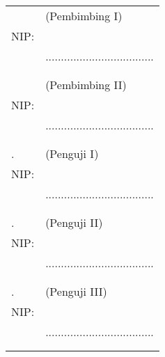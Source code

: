 \noindent
\begin{tabularx}{\textwidth}{X l}
  \advisor{}               & (Pembimbing I)                      \\
  NIP: \advisornip{}       &                                     \\
                           & ................................... \\
                           &                                     \\
                           &                                     \\
  \coadvisor{}             & (Pembimbing II)                     \\
  NIP: \coadvisornip{}     &                                     \\
                           & ................................... \\
                           &                                     \\
                           &                                     \\
  \examinerone{}.          & (Penguji I)                         \\
  NIP: \examineronenip{}   &                                     \\
                           & ................................... \\
                           &                                     \\
                           &                                     \\
  \examinertwo{}.          & (Penguji II)                        \\
  NIP: \examinertwonip{}   &                                     \\
                           & ................................... \\
                           &                                     \\
                           &                                     \\
  \examinerthree{}.        & (Penguji III)                       \\
  NIP: \examinerthreenip{} &                                     \\
                           & ................................... \\
                           &                                     \\
                           &                                     \\
\end{tabularx}
\endgroup

